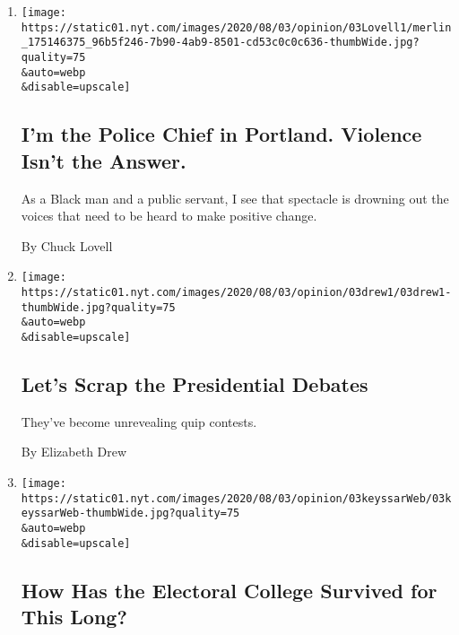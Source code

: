 \begin{enumerate}
\def\labelenumi{\arabic{enumi}.}
\item
  \href{/2020/08/03/opinion/portland-protests-police-chief.html}{}

  \texttt{[image: https://static01.nyt.com/images/2020/08/03/opinion/03Lovell1/merlin\_175146375\_96b5f246-7b90-4ab9-8501-cd53c0c0c636-thumbWide.jpg?quality=75\\\&auto=webp\\\&disable=upscale]}

  \hypertarget{im-the-police-chief-in-portland-violence-isnt-the-answer}{%
  \subsection{I'm the Police Chief in Portland. Violence Isn't the
  Answer.}\label{im-the-police-chief-in-portland-violence-isnt-the-answer}}

  As a Black man and a public servant, I see that spectacle is drowning
  out the voices that need to be heard to make positive change.

  By Chuck Lovell
\item
  \href{/2020/08/03/opinion/trump-biden-presidential-debates-2020.html}{}

  \texttt{[image: https://static01.nyt.com/images/2020/08/03/opinion/03drew1/03drew1-thumbWide.jpg?quality=75\\\&auto=webp\\\&disable=upscale]}

  \hypertarget{lets-scrap-the-presidential-debates}{%
  \subsection{Let's Scrap the Presidential
  Debates}\label{lets-scrap-the-presidential-debates}}

  They've become unrevealing quip contests.

  By Elizabeth Drew
\item
  \href{/2020/08/03/opinion/electoral-college-racism-white-supremacy.html}{}

  \texttt{[image: https://static01.nyt.com/images/2020/08/03/opinion/03keyssarWeb/03keyssarWeb-thumbWide.jpg?quality=75\\\&auto=webp\\\&disable=upscale]}

  \hypertarget{how-has-the-electoral-college-survived-for-this-long}{%
  \subsection{How Has the Electoral College Survived for This
  Long?}\label{how-has-the-electoral-college-survived-for-this-long}}


\end{enumerate}
